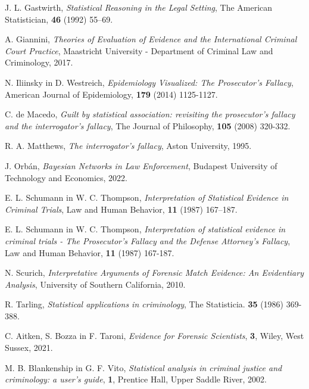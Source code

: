 \documentclass[mat1, tisk]{fmfdelo}
\theoremstyle{definition} %
\theoremstyle{trditev} %
\theoremstyle{izrek}
\begin{document}
\begin{thebibliography}{99}
        J. L. Gastwirth, \emph{Statistical Reasoning in the Legal Setting}, The American Statistician, \textbf{46} (1992) 55–69.

        A. Giannini, \emph{Theories of Evaluation of Evidence and the International Criminal Court Practice}, Maastricht University - Department of Criminal Law and Criminology, 2017.

        N. Iliinsky in D. Westreich, \emph{Epidemiology Visualized: The Prosecutor’s Fallacy}, American Journal of Epidemiology, \textbf{179} (2014) 1125-1127.

        C. de Macedo, \emph{Guilt by statistical association: revisiting the prosecutor’s fallacy and the interrogator’s fallacy}, The Journal of Philosophy, \textbf{105} (2008) 320-332.

        R. A. Matthews, \emph{The interrogator’s fallacy}, Aston University, 1995.

        J. Orbán, \emph{Bayesian Networks in Law Enforcement}, Budapest University of Technology and Economics, 2022.

        E. L. Schumann in W. C. Thompson, \emph{Interpretation of Statistical Evidence in Criminal Trials}, Law and Human Behavior, \textbf{11} (1987) 167–187.

        E. L. Schumann in W. C. Thompson, \emph{Interpretation of statistical evidence in criminal trials - The Prosecutor's Fallacy and the Defense Attorney's Fallacy}, Law and Human Behavior, \textbf{11} (1987) 167-187.

        N. Scurich, \emph{Interpretative Arguments of Forensic Match Evidence: An Evidentiary Analysis}, University of Southern California, 2010.

        R. Tarling, \emph{Statistical applications in criminology}, The Statisticia. \textbf{35} (1986) 369-388.

        C. Aitken, S. Bozza in F. Taroni, \emph{Evidence for Forensic Scientists}, \textbf{3}, Wiley, West Sussex, 2021.

        M. B. Blankenship in G. F. Vito, \emph{Statistical analysis in criminal justice and criminology: a user's guide}, \textbf{1}, Prentice Hall, Upper Saddle River, 2002.


\end{thebibliography}
\end{document}

